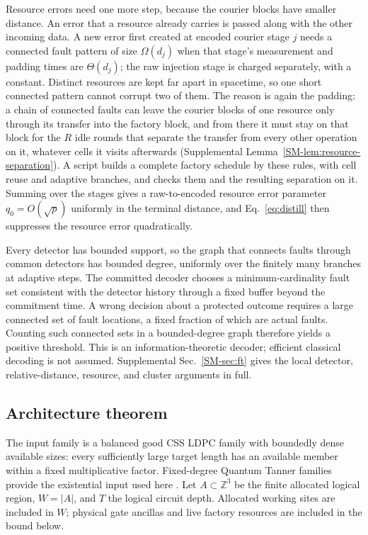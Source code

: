 Resource errors need one more step, because the courier blocks have smaller
distance.  An error that a resource already carries is passed along with the
other incoming data.  A new error first created at encoded courier stage $j$
needs a connected fault pattern of size $\Omega(d_j)$ when that stage's
measurement and padding times are $\Theta(d_j)$; the raw injection stage is
charged separately, with a constant.  Distinct resources are kept far apart in
spacetime, so one short connected pattern cannot corrupt two of them.  The
reason is again the padding: a chain of connected faults can leave the
courier blocks of one resource only through its transfer into the factory
block, and from there it must stay on that block for the $R$ idle rounds
that separate the transfer from every other operation on it, whatever cells
it visits afterwards (Supplemental Lemma~\ref{SM-lem:resource-separation}).
A script builds a complete factory schedule by these rules, with cell reuse
and adaptive branches, and checks them and the resulting separation on it.
Summing
over the stages gives a raw-to-encoded resource error parameter
$q_0=O(\sqrt p)$ uniformly in the terminal distance, and
Eq.~\eqref{eq:distill} then suppresses the resource error quadratically.

Every detector has bounded support, so the graph that connects faults
through common detectors has bounded degree, uniformly over the finitely many
branches at adaptive steps.  The committed decoder chooses a minimum-cardinality fault set consistent with
the detector history through a fixed buffer beyond the commitment time.  A
wrong decision about a protected outcome requires a large connected set of
fault locations, a fixed fraction of which are actual faults.  Counting such
connected sets in a bounded-degree graph therefore yields a positive
threshold. This is an information-theoretic
decoder; efficient classical decoding is not assumed. Supplemental
Sec.~\ref{SM-sec:ft} gives the local detector, relative-distance, resource,
and cluster arguments in full.

\subsection{Architecture theorem}
The input family is a balanced good CSS LDPC family with boundedly dense
available sizes: every sufficiently large target length has an available
member within a fixed multiplicative factor. Fixed-degree Quantum Tanner
families provide the existential input used here
\cite{LeverrierZemorTanner,DinurLTC}. Let $A\subset\mathbb Z^3$ be the finite
allocated logical region, $W=|A|$, and $T$ the logical circuit depth. Allocated
working sites are included in $W$; physical gate ancillas and live factory
resources are included in the bound below.

